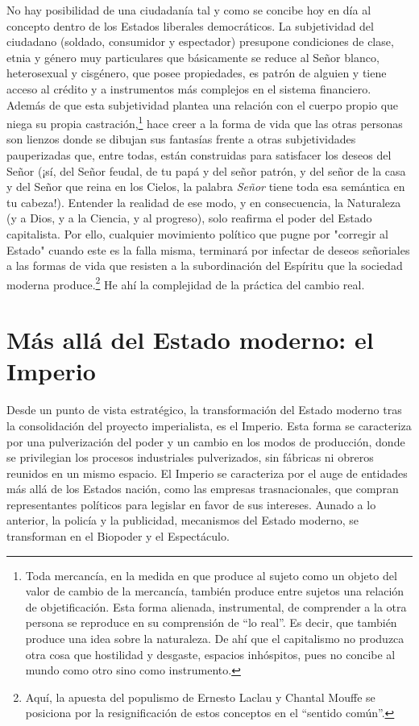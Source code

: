 No hay posibilidad de una ciudadanía tal y como se concibe hoy en día al concepto dentro de los Estados liberales democráticos. La subjetividad del ciudadano (soldado, consumidor y espectador) presupone condiciones de clase, etnia y género muy particulares que básicamente se reduce al Señor blanco, heterosexual y cisgénero, que posee propiedades, es patrón de alguien y tiene acceso al crédito y a instrumentos más complejos en el sistema financiero. Además de que esta subjetividad plantea una relación con el cuerpo propio que niega su propia castración,\footnote{Toda mercancía, en la medida en que produce al sujeto como un objeto del valor de cambio de la mercancía, también produce entre sujetos una relación de objetificación. Esta forma alienada, instrumental, de comprender a la otra persona se reproduce en su comprensión de \enquote{lo real}. Es decir, que también produce una idea sobre la naturaleza. De ahí que el capitalismo no produzca otra cosa que hostilidad y desgaste, espacios inhóspitos, pues no concibe al mundo como otro sino como instrumento.} hace creer a la forma de vida que las otras personas son lienzos donde se dibujan sus fantasías frente a otras subjetividades pauperizadas que, entre todas, están construidas para satisfacer los deseos del Señor (¡sí, del Señor feudal, de tu papá y del señor patrón, y del señor de la casa y del Señor que reina en los Cielos, la palabra \emph{Señor} tiene toda esa semántica en tu cabeza!). Entender la realidad de ese modo, y en consecuencia, la Naturaleza (y a Dios, y a la Ciencia, y al progreso), solo reafirma el poder del Estado capitalista. Por ello, cualquier movimiento político que pugne por "corregir al Estado" cuando este es la falla misma, terminará por infectar de deseos señoriales a las formas de vida que resisten a la subordinación del Espíritu que la sociedad moderna produce.\footnote{Aquí, la apuesta del populismo de Ernesto Laclau y Chantal Mouffe se posiciona por la resignificación de estos conceptos en el \enquote{sentido común}.} He ahí la complejidad de la práctica del cambio real.

\section{Más allá del Estado moderno: el Imperio}
\label{sec:imperio}

Desde un punto de vista estratégico, la transformación del Estado moderno tras la consolidación del proyecto imperialista, es el Imperio. Esta forma se caracteriza por una pulverización del poder y un cambio en los modos de producción, donde se privilegian los procesos industriales pulverizados, sin fábricas ni obreros reunidos en un mismo espacio. El Imperio se caracteriza por el auge de entidades más allá de los Estados nación, como las empresas trasnacionales, que compran representantes políticos para legislar en favor de sus intereses. Aunado a lo anterior, la policía y la publicidad, mecanismos del Estado moderno, se transforman en el Biopoder y el Espectáculo.

